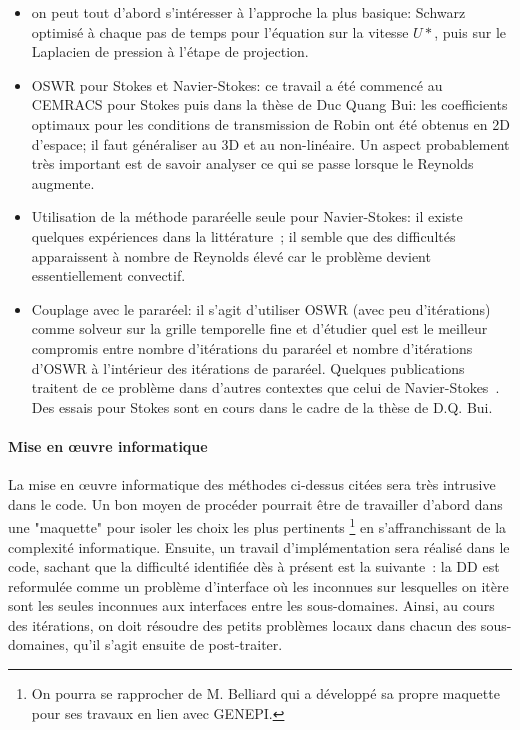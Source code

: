 \begin{itemize}
\item
on peut tout d'abord s'int\'eresser \`a l'approche la plus basique: Schwarz optimis\'e \`a chaque pas de temps  pour l'\'equation sur la vitesse $U*$, puis sur le Laplacien de pression \`a l'\'etape de projection. 
\item
OSWR pour Stokes et Navier-Stokes: ce travail a \'et\'e commenc\'e au CEMRACS pour Stokes puis dans la th\`ese de Duc Quang Bui: les coefficients optimaux pour les conditions de transmission de Robin ont \'et\'e obtenus en 2D d'espace; il faut g\'en\'eraliser au 3D et au non-lin\'eaire. Un aspect probablement tr\`es important est de savoir analyser ce qui se passe lorsque le Reynolds augmente.
\item
Utilisation de la m\'ethode parar\'eelle seule pour Navier-Stokes: il existe quelques exp\'eriences dans la litt\'erature~\cite{fischer2005parareal, steiner2015convergence}; il semble que des difficult\'es apparaissent \`a nombre de Reynolds \'elev\'e car le probl\`eme devient essentiellement convectif.
\item
Couplage avec le parar\'eel: il s'agit d'utiliser OSWR (avec peu d'it\'erations) comme solveur sur la grille temporelle fine et d'\'etudier quel est le meilleur compromis entre nombre d'it\'erations du parar\'eel et nombre d'it\'erations d'OSWR \`a l'int\'erieur des it\'erations de parar\'eel. Quelques publications traitent de ce probl\`eme dans d'autres contextes que celui de Navier-Stokes~\cite{hernandez2014quelques, gander2013parareal}. Des essais pour Stokes sont en cours dans le cadre de la th\`ese de D.Q. Bui.
\end{itemize}


\paragraph{Mise en {\oe}uvre informatique}
La mise en {\oe}uvre informatique des m\'ethodes ci-dessus cit\'ees sera tr\`es intrusive dans le code. Un bon moyen de proc\'eder pourrait \^etre de travailler d'abord dans une "maquette" pour isoler les choix les plus pertinents \footnote{ On pourra se rapprocher de M. Belliard qui a d\'evelopp\'e sa propre maquette pour ses travaux en lien avec GENEPI.} en s'affranchissant de la complexit\'e informatique. Ensuite, un travail d'impl\'ementation sera r\'ealis\'e dans le code, sachant que la difficult\'e identifi\'ee d\`es \`a pr\'esent est la suivante~: la DD est reformul\'ee comme un probl\`eme d'interface o\`u les inconnues sur lesquelles on it\`ere sont les seules inconnues aux interfaces entre les sous-domaines. Ainsi, au cours des it\'erations, on doit r\'esoudre des petits probl\`emes locaux dans chacun des sous-domaines, qu'il s'agit ensuite de post-traiter.

